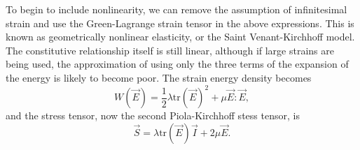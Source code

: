 To begin to include nonlinearity, we can remove the assumption of infinitesimal strain and use the Green-Lagrange strain tensor in the above expressions.
This is known as geometrically nonlinear elasticity, or the Saint Venant-Kirchhoff model.
The constitutive relationship itself is still linear, although if large strains are being used, the approximation of using only the three terms of the expansion of the energy is likely to become poor.
The strain energy density becomes
\begin{equation}
    W(\vec{E}) = \frac{1}{2} \lambda \textrm{tr} (\vec{E})^{2} + \mu \vec{E} : \vec{E},
\end{equation}
and the stress tensor, now the second Piola-Kirchhoff stess tensor, is
\begin{equation}
    \vec{S} = \lambda \textrm{tr} (\vec{E}) \vec{I} + 2 \mu \vec{E}.
\end{equation}


